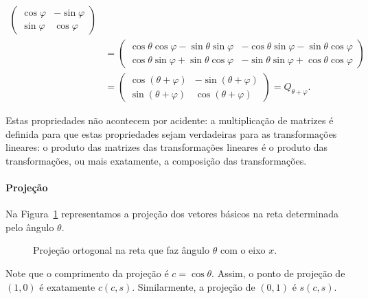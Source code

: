 \begin{itemize}
\begin{align*}
     \begin{pmatrix}
        \cos{\varphi} & -\sin{\varphi}\\
        \sin{\varphi} & \cos{\varphi}
     \end{pmatrix}
     \\
     &=
     \begin{pmatrix}
        \cos{\theta}\cos{\varphi}-\sin{\theta}\sin{\varphi} & -\cos{\theta}\sin{\varphi}-\sin{\theta}\cos{\varphi}\\
        \cos{\theta}\sin{\varphi}+\sin{\theta}\cos{\varphi} & -\sin{\theta}\sin{\varphi} + \cos{\theta}\cos{\varphi}
     \end{pmatrix}
     \\
     &=
     \begin{pmatrix}
        \cos{(\theta+\varphi)} & -\sin{(\theta+\varphi)}\\
        \sin{(\theta+\varphi)} & \cos{(\theta+\varphi)}
     \end{pmatrix}
     = Q_{\theta+\varphi}.
  \end{align*}
\end{itemize}

Estas propriedades não acontecem por acidente: a multiplicação de matrizes é definida para que estas propriedades sejam verdadeiras para as transformações lineares: o produto das matrizes das transformações lineares é o produto das transformações, ou mais exatamente, a composição das transformações.

\paragraph*{Projeção} Na Figura~\ref{fig:projecao} representamos a projeção dos vetores básicos na reta determinada pelo ângulo $\theta$.
\begin{figure}[!h]
  \centering
  \caption{Projeção ortogonal na reta que faz ângulo $\theta$ com o eixo $x$.}
  \label{fig:projecao}
\end{figure}
Note que o comprimento da projeção é $c=\cos{\theta}$. Assim, o ponto de projeção de $(1,0)$ é exatamente $c(c,s)$. Similarmente, a projeção de $(0,1)$ é $s(c,s)$.

